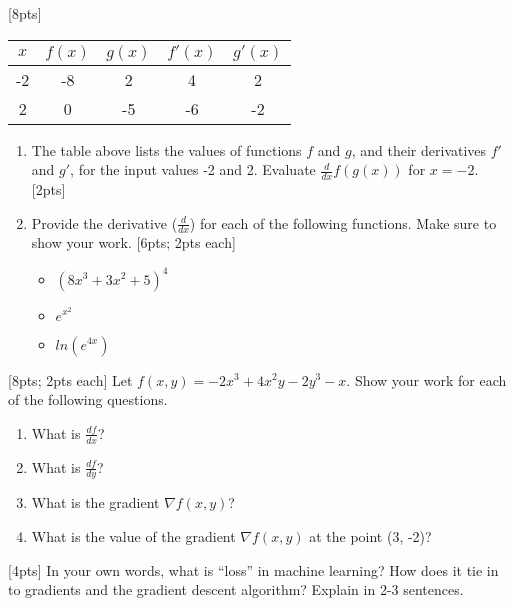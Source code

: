 \documentclass[11pt]{article}
\begin{document}
\newpage
{} [8pts]

\begin{table}[h]
  \centering
  \small
  \begin{tabular}{ccccc}
    \toprule
    $x$ & $f(x)$ & $g(x)$ & $f'(x)$ & $g'(x)$ \\
    \midrule
    -2 & -8 & 2 & 4 & 2 \\
    2 & 0 & -5 & -6 & -2 \\
    \bottomrule
  \end{tabular}
  \label{tab:chain_rule}
\end{table}

\begin{enumerate}[label=\alph*.]
  \setlength\itemsep{2em}
  \item The table above lists the values of functions $f$ and $g$, and their derivatives $f'$ and $g'$, for the input values -2 and 2. Evaluate $\frac{d}{dx}f(g(x))$ for $x=-2$. [2pts]
  \item Provide the derivative ($\frac{d}{dx}$) for each of the following functions. Make sure to show your work. [6pts; 2pts each]
  \begin{itemize}
    \setlength\itemsep{1em}
    \item $(8x^3 + 3x^2 +5)^4$
    \item $e^{x^2}$
    \item $ln(e^{4x})$
  \end{itemize}
\end{enumerate}

\vspace{2em}
 [8pts; 2pts each] Let $f(x,y) = -2x^3 + 4x^2y - 2y^3 - x$. Show your work for each of the following questions.
\begin{enumerate}[label=\alph*.]
  \setlength\itemsep{2em}
  \item What is $\frac{df}{dx}$?
  \item What is $\frac{df}{dy}$?
  \item What is the gradient $\nabla f(x,y)$?
  \item What is the value of the gradient $\nabla f(x,y)$ at the point (3, -2)?
\end{enumerate}

\vspace{2em}
 [4pts] In your own words, what is ``loss'' in machine learning? How does it tie in to gradients and the gradient descent algorithm? Explain in 2-3 sentences.
\end{document}
